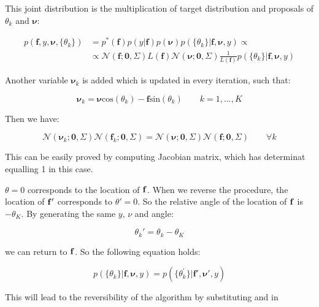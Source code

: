 \documentclass{article}
\begin{document}
This joint distribution is the multiplication of target distribution and proposals of ${\theta_k}$ and $\pmb{\nu}$:

\begin{align}\label{newtarget}
p(\mathbf{f}, y, \pmb{\nu},\lbrace\theta_k\rbrace)&=p^*(\mathbf{f})p(y|\mathbf{f})p(\pmb{\nu})p(\lbrace\theta_k\rbrace|\mathbf{f},\pmb{\nu},y)\propto\\
&\propto\mathcal{N}(\mathbf{f};\mathbf{0},\Sigma)L(\mathbf{f})\mathcal{N}(\pmb{\nu};\mathbf{0},\Sigma)\frac{1}{L(\mathbf{f})}p(\lbrace\theta_k\rbrace|\mathbf{f},\pmb{\nu},y)
\end{align}

Another variable $\pmb{\nu}_k$ is added which is updated in every iteration, such that:

\begin{equation}
\pmb{\nu}_k = \pmb{\nu} \text{cos}(\theta_k) - \mathbf{f}\text{sin}(\theta_k)\qquad k=1,...,K
\end{equation}

Then we have:

\begin{equation}\label{gaussians}
\mathcal{N}(\pmb{\nu}_k;\mathbf{0},\Sigma)\mathcal{N}(\mathbf{f}_k;\mathbf{0},\Sigma)=\mathcal{N}(\pmb{\nu};\mathbf{0},\Sigma)\mathcal{N}(\mathbf{f};\mathbf{0},\Sigma) \qquad\forall{k}
\end{equation}

This can be easily proved by computing Jacobian matrix, which has determinat equalling 1 in this case.

$\theta = 0$ corresponds to the location of $\bf{f}$. When we reverse the procedure, the location of $\bf{f'}$ corresponds to $\theta' = 0$. So the relative angle of the location of $\bf{f}$ is $-\theta_K$. By generating the same $y$, $\nu$ and angle:

\begin{equation}
\theta_k' = \theta_k-\theta_K
\end{equation}

we can return to $\bf{f}$. So the following equation holds:

\begin{equation}\label{angles}
p(\lbrace\theta_k\rbrace|\mathbf{f},\pmb{\nu},y)=p(\lbrace\theta_k^{'}\rbrace|\mathbf{f'},\pmb{\nu'},y)
\end{equation}

This will lead to the reversibility of the algorithm by substituting %
and %
in %
\end{document}

